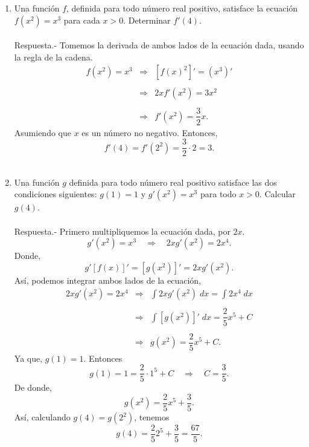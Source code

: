 \begin{enumerate}[\bfseries 1.]
\begin{enumerate}[a)]
    \end{enumerate}

    \item Una función $f$, definida para todo número real positivo, satisface la ecuación $f\left(x^2\right)=x^3$ para cada $x>0$. Determinar $f'(4)$.\\\\
	Respuesta.-\; Tomemos la derivada de ambos lados de la ecuación dada, usando la regla de la cadena.
	$$
	\begin{array}{rcl}
	    f\left(x^2\right)=x^3 &\Rightarrow& \left[f\left(x\right)^2\right]' = \left(x^3\right)'\\\\
	    &\Rightarrow& 2xf'\left(x^2\right) = 3x^2\\\\
	    &\Rightarrow& f'\left(x^2\right) = \dfrac{3}{2} x.
	\end{array}
	$$
	Asumiendo que $x$ es un número no negativo. Entonces,
	$$f'(4)=f'\left(2^2\right)=\dfrac{3}{2}\cdot 2=3.$$\\

    \item Una función $g$ definida para todo número real positivo satisface las dos condiciones siguientes: $g(1)=1$ y $g'\left(x^2\right)=x^3$ para todo $x>0$. Calcular $g(4)$.\\\\
	Respuesta.-\; Primero multipliquemos la ecuación dada, por $2x$.
	$$g'\left(x^2\right)=x^3\quad \Rightarrow \quad 2xg'\left(x^2\right)=2x^4.$$
	Donde, 
	$$g'\left[f(x)\right]'=\left[g\left(x^2\right)\right]'=2xg'\left(x^2\right).$$
	Así, podemos integrar ambos lados de la ecuación,
	$$
	\begin{array}{rcl}
	    2xg'\left(x^2\right) = 2x^4 &\Rightarrow & \displaystyle\int 2xg'\left(x^2\right)\; dx = \displaystyle\int 2x^4\; dx\\\\
					&\Rightarrow & \displaystyle\int \left[g\left(x^2\right)\right]'\; dx = \dfrac{2}{5}x^5+C\\\\
					&\Rightarrow & g\left(x^2\right) = \dfrac{2}{5}x^5+C.
	\end{array}
	$$
	Ya que, $g(1)=1$. Entonces
	$$g(1)=1=\dfrac{2}{5}\cdot 1^5+C\quad \Rightarrow \quad C=\dfrac{3}{5}.$$
	De donde,
	$$g\left(x^2\right)=\dfrac{2}{5}x^5+\dfrac{3}{5}.$$
	Así, calculando $g\left(4\right)=g\left(2^2\right)$, tenemos
	$$g\left(4\right)=\dfrac{2}{5}2^5+\dfrac{3}{5}=\dfrac{67}{5}.$$\\



\end{enumerate}
